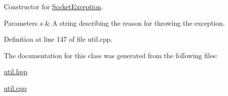 \-Constructor for \hyperlink{classLibWheel_1_1SocketException}{\-Socket\-Exception}. 


\begin{DoxyParams}{\-Parameters}
{\em s} & \-A string describing the reason for throwing the exception. \\
\hline
\end{DoxyParams}


\-Definition at line 147 of file util.\-cpp.



\-The documentation for this class was generated from the following files\-:\begin{DoxyCompactItemize}
\item 
\hyperlink{util_8hpp}{util.\-hpp}\item 
\hyperlink{util_8cpp}{util.\-cpp}\end{DoxyCompactItemize}
